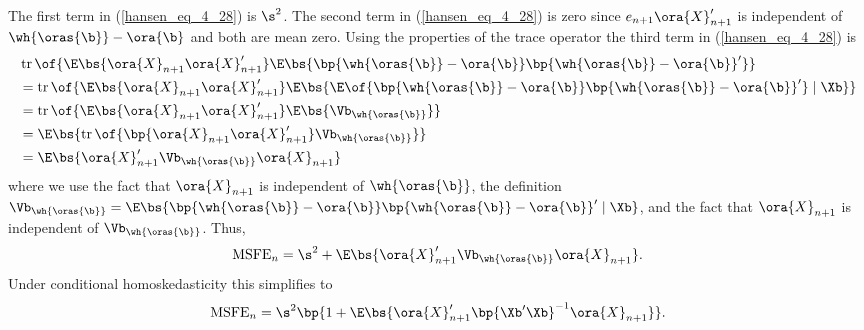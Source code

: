 The first term in (\ref{hansen_eq_4_28}) is $\s^2$. The second term in (\ref{hansen_eq_4_28}) is zero since $e_{n+1} \ora{X}_{n+1}^\prime$ is independent of $\wh{\oras{\b}} - \ora{\b}$ and both are mean zero. Using the properties of the trace operator the third term in (\ref{hansen_eq_4_28}) is 
\begin{equation}
    \label{hansen_eq_4_29}
    \begin{aligned}
        & \operatorname{tr}\of{\E\bs{\ora{X}_{n+1} \ora{X}_{n+1}^\prime} \E\bs{\bp{\wh{\oras{\b}} - \ora{\b}} \bp{\wh{\oras{\b}} - \ora{\b}}^\prime}} \\
        & = \operatorname{tr}\of{\E\bs{\ora{X}_{n+1} \ora{X}_{n+1}^\prime} \E\bs{\E\of{\bp{\wh{\oras{\b}} - \ora{\b}} \bp{\wh{\oras{\b}} - \ora{\b}}^\prime} \mid \Xb}} \\
        & = \operatorname{tr}\of{\E\bs{\ora{X}_{n+1} \ora{X}_{n+1}^\prime} \E\bs{\Vb_{\wh{\oras{\b}}}} } \\
        & = \E\bs{\operatorname{tr}\of{\bp{\ora{X}_{n+1} \ora{X}_{n+1}^\prime} \Vb_{\wh{\oras{\b}}}}} \\
        & = \E\bs{\ora{X}_{n+1}^\prime \Vb_{\wh{\oras{\b}}} \ora{X}_{n+1}}
    \end{aligned}
\end{equation}
where we use the fact that $\ora{X}_{n+1}$ is independent of $\wh{\oras{\b}}$, the definition $\Vb_{\wh{\oras{\b}}} = \E\bs{\bp{\wh{\oras{\b}} - \ora{\b}} \bp{\wh{\oras{\b}} - \ora{\b}}^\prime \mid \Xb}$, and the fact that $\ora{X}_{n+1}$ is independent of $\Vb_{\wh{\oras{\b}}}$. Thus,
\begin{equation}
    \notag
    \operatorname{MSFE}_n = \s^2 + \E\bs{\ora{X}_{n+1}^\prime \Vb_{\wh{\oras{\b}}} \ora{X}_{n+1}}.
\end{equation}
Under conditional homoskedasticity this simplifies to
\begin{equation}
    \notag
    \operatorname{MSFE}_n = \s^2 \bp{1 + \E\bs{\ora{X}_{n+1}^\prime \bp{\Xb^\prime \Xb}^{-1} \ora{X}_{n+1}}} .
\end{equation}

